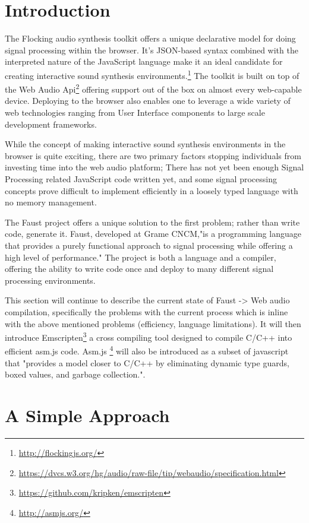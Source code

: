 \documentclass[runningheads,a4paper]{llncs}
\begin{document}
\section{Introduction}

The Flocking audio synthesis toolkit offers a unique declarative model for doing signal processing within the browser.  It's JSON-based syntax combined with the interpreted nature of the JavaScript language make it an ideal candidate for creating interactive sound synthesis environments.\footnote{\url{http://flockingjs.org/}} The toolkit is built on top of the Web Audio Api\footnote{\url{https://dvcs.w3.org/hg/audio/raw-file/tip/webaudio/specification.html}} offering support out of the box on almost every web-capable device.  Deploying to the browser also enables one to leverage a wide variety of web technologies ranging from User Interface components to large scale development frameworks. 

While the concept of making interactive sound synthesis environments in the browser is quite exciting, there are two primary factors stopping individuals from investing time into the web audio platform; There has not yet been enough Signal Processing related JavaScript code written yet, and some signal processing concepts prove difficult to implement efficiently in a loosely typed language with no memory management.

The Faust project offers a unique solution to the first problem; rather than write code, generate it.  Faust, developed at Grame CNCM,"is a programming language that provides a purely functional approach to signal processing while offering a high level of performance." \cite{orlarey:09c}  The project is both a language and a compiler, offering the ability to write code once and deploy to many different signal processing environments.

This section will continue to describe the current state of Faust -> Web audio compilation, specifically the problems with the current process which is inline with the above mentioned problems (efficiency, language limitations).  It will then introduce Emscripten\footnote{\url{https://github.com/kripken/emscripten}} a cross compiling tool designed to compile C/C++ into efficient asm.js code.  Asm.js \footnote{\url{http://asmjs.org/}} will also be introduced as a subset of javascript that "provides a model closer to C/C++ by eliminating dynamic type guards, boxed values, and garbage collection."\cite{asm-js}.

\section{A Simple Approach}
\end{document}
